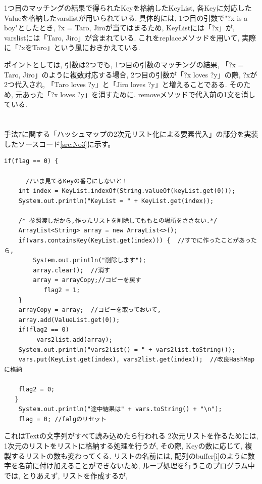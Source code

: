 \documentclass[uplatex,12pt]{jsarticle}
\begin{document}
1つ目のマッチングの結果で得られたKeyを格納したKeyList, 各Keyに対応したValueを格納したvarslistが用いられている. 具体的には, 1つ目の引数で"?x is a boy"としたとき, ?x = Taro, Jiroが当てはまるため, KeyListには「?x」が, varslistには「Taro, Jiro」が含まれている. これをreplaceメソッドを用いて, 実際に「?xをTaro」という風におきかえている.

ポイントとしては, 引数は2つでも, 1つ目の引数のマッチングの結果, 「?x = Taro, Jiro」のように複数対応する場合, 2つ目の引数が「?x loves ?y」の際, ?xが2つ代入され, 「Taro loves ?y」と「Jiro loves ?y」と増えることである. そのため, 元あった「?x loves ?y」を消すために. removeメソッドで代入前の1文を消している.\\\\\\


手法7に関する「ハッシュマップの2次元リスト化による要素代入」の部分を実装したソースコード\ref{src:No3}に示す。
\begin{lstlisting}[caption=ハッシュマップの2次元リスト化,label=src:No3]
   if(flag == 0) {

      //いま見てるKeyの番号にしないと！
	int index = KeyList.indexOf(String.valueOf(keyList.get(0)));
	System.out.println("KeyList = " + KeyList.get(index));
	
	/* 参照渡しだから,作ったリストを削除してももとの場所をささない.*/
	ArrayList<String> array = new ArrayList<>();
	if(vars.containsKey(KeyList.get(index))) {	//すでに作ったことがあったら,
	    System.out.println("削除します");
	    array.clear();	//消す
	    array = arrayCopy;//コピーを戻す
		   flag2 = 1;
	}
	arrayCopy = array;	//コピーを取っておいて,
	array.add(ValueList.get(0));
	if(flag2 == 0)
	     vars2list.add(array);
	System.out.println("vars2list() = " + vars2list.toString());
	vars.put(KeyList.get(index), vars2list.get(index));  //改良HashMapに格納

	flag2 = 0;
   }
    System.out.println("途中結果は" + vars.toString() + "\n");
    flag = 0; //falgのリセット
\end{lstlisting}

これはTextの文字列がすべて読み込めたら行われる
2次元リストを作るためには, 1次元のリストをリストに格納する処理を行うが, その際, Keyの数に応じて, 複製するリストの数も変わってくる. リストの名前には, 配列のbuffer[i]のように数字を名前に付け加えることができないため, ループ処理を行うこのプログラム中では, とりあえず, リストを作成するが, 
\end{document}
